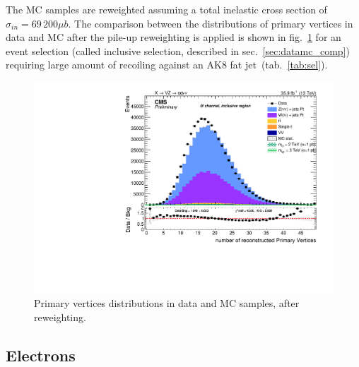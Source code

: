 \noindent The MC samples are reweighted assuming a total inelastic cross section of $\sigma_{in} = 69\,200 \mu b$. The comparison between the distributions of primary vertices in data and MC after the pile-up reweighting is applied is shown in fig.~\ref{fig:npv} for an event selection (called inclusive selection, described in sec.~\ref{sec:datamc_comp}) requiring large amount of \met recoiling against an AK8 fat jet~(tab.~\ref{tab:sel}).
 
 \begin{figure}[!htb]
  \centering
    \includegraphics[width=.495\textwidth]{plots/v9_U/XVZnnInc/nPV.pdf}
  \caption{Primary vertices distributions in data and MC samples, after reweighting.}
  \label{fig:npv}
 \end{figure}


\subsection{Electrons}\label{ssec:electrons}

